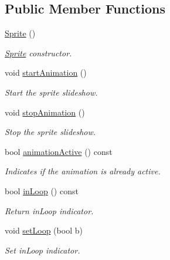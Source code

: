 \subsection*{Public Member Functions}
\begin{DoxyCompactItemize}
\item 
\mbox{\label{class_sprite_a12cba3ac1868418add3c4d95ce87e615}} 
\hyperlink{class_sprite_a12cba3ac1868418add3c4d95ce87e615}{Sprite} ()
\begin{DoxyCompactList}\small\item\em \hyperlink{class_sprite}{Sprite} constructor. \end{DoxyCompactList}\item 
\mbox{\label{class_sprite_ac7d053af8f5cf1221d3cf016a4c65874}} 
void \hyperlink{class_sprite_ac7d053af8f5cf1221d3cf016a4c65874}{start\+Animation} ()
\begin{DoxyCompactList}\small\item\em Start the sprite slideshow. \end{DoxyCompactList}\item 
\mbox{\label{class_sprite_a7fc484c57aa07b95311eacf27d789a0c}} 
void \hyperlink{class_sprite_a7fc484c57aa07b95311eacf27d789a0c}{stop\+Animation} ()
\begin{DoxyCompactList}\small\item\em Stop the sprite slideshow. \end{DoxyCompactList}\item 
bool \hyperlink{class_sprite_aaf6364fea1ba44d95134a34ebd449c6b}{animation\+Active} () const
\begin{DoxyCompactList}\small\item\em Indicates if the animation is already active. \end{DoxyCompactList}\item 
bool \hyperlink{class_sprite_aa43fae53d9d60a1d86096b781135f380}{in\+Loop} () const
\begin{DoxyCompactList}\small\item\em Return in\+Loop indicator. \end{DoxyCompactList}\item 
void \hyperlink{class_sprite_a37869d23b6c3884f6ff856680e2c2e30}{set\+Loop} (bool b)
\begin{DoxyCompactList}\small\item\em Set in\+Loop indicator. \end{DoxyCompactList}\item 

\end{DoxyCompactItemize}
